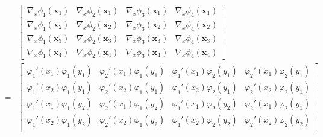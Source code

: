\documentclass[12pt,a4paper]{article}
\begin{document}
\begin{align*}
& \left[
\begin{array}{cccc}
\nabla_x \phi_1(\textbf{x}_1) & \nabla_x \phi_2(\textbf{x}_1) & \nabla_x \phi_3(\textbf{x}_1) & \nabla_x \phi_4(\textbf{x}_1) \\
\nabla_x \phi_1(\textbf{x}_2) & \nabla_x \phi_2(\textbf{x}_2) & \nabla_x \phi_3(\textbf{x}_2) & \nabla_x \phi_4(\textbf{x}_2) \\
\nabla_x \phi_1(\textbf{x}_3) & \nabla_x \phi_2(\textbf{x}_3) & \nabla_x \phi_3(\textbf{x}_3) & \nabla_x \phi_4(\textbf{x}_3) \\
\nabla_x \phi_1(\textbf{x}_4) & \nabla_x \phi_2(\textbf{x}_4) & \nabla_x \phi_3(\textbf{x}_4) & \nabla_x \phi_4(\textbf{x}_4)
\end{array}
\right] \\
= &
\left[
\begin{array}{cccc}
\varphi_1'(x_1) \varphi_1(y_1) & \varphi_2'(x_1) \varphi_1(y_1) & \varphi_1'(x_1) \varphi_2(y_1) & \varphi_2'(x_1) \varphi_2(y_1) \\
\varphi_1'(x_2) \varphi_1(y_1) & \varphi_2'(x_2) \varphi_1(y_1) & \varphi_1'(x_2) \varphi_2(y_1) & \varphi_2'(x_2) \varphi_2(y_1) \\
\varphi_1'(x_1) \varphi_1(y_2) & \varphi_2'(x_1) \varphi_1(y_2) & \varphi_1'(x_1) \varphi_2(y_2) & \varphi_2'(x_1) \varphi_2(y_1) \\
\varphi_1'(x_2) \varphi_1(y_2) & \varphi_2'(x_2) \varphi_1(y_2) & \varphi_1'(x_2) \varphi_2(y_2) & \varphi_2'(x_2) \varphi_2(y_2) \\
\end{array}
\right]
\end{align*}
\end{document}
